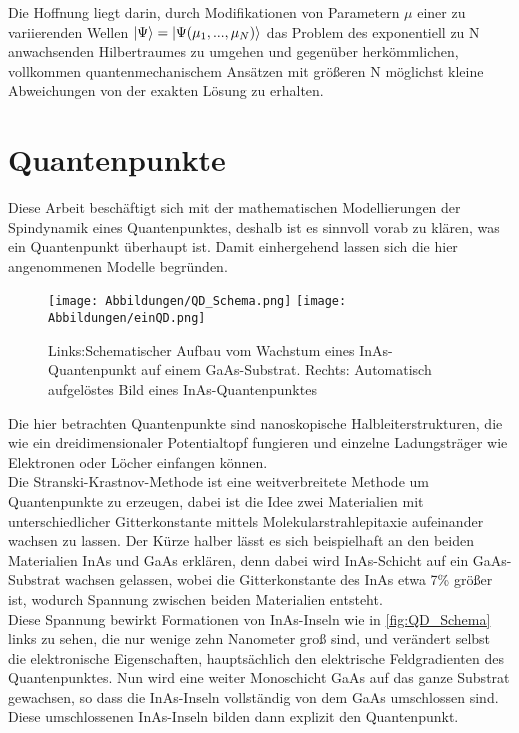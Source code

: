 \documentclass[12pt]{article}
\begin{document}
\noindent Die Hoffnung liegt darin, durch Modifikationen von Parametern $\mu$ einer zu variierenden Wellen 
$\ket{\Psi} = \ket{\Psi(\mu_1,...,\mu_N)}$ das Problem des exponentiell zu N anwachsenden Hilbertraumes zu umgehen und gegenüber 
herkömmlichen, vollkommen quantenmechanischem Ansätzen mit größeren N möglichst kleine Abweichungen von der exakten Lösung zu erhalten.

\newpage

















\section{Quantenpunkte}
\noindent Diese Arbeit beschäftigt sich mit der mathematischen Modellierungen der Spindynamik eines Quantenpunktes, deshalb ist es 
sinnvoll vorab zu klären, was ein Quantenpunkt überhaupt ist. Damit einhergehend lassen sich die hier angenommenen Modelle begründen.\\



\begin{figure}[h!]
    \centering
    \texttt{[image: Abbildungen/QD\_Schema.png]}
    \texttt{[image: Abbildungen/einQD.png]}
    \caption{Links:Schematischer Aufbau vom Wachstum eines InAs-Quantenpunkt auf einem GaAs-Substrat. Rechts: Automatisch 
    aufgelöstes Bild eines InAs-Quantenpunktes}
    \label{fig:QD_Schema}
\end{figure}

\noindent Die hier betrachten Quantenpunkte sind nanoskopische Halbleiterstrukturen, die wie ein dreidimensionaler Potentialtopf fungieren
 und einzelne Ladungsträger wie Elektronen oder Löcher einfangen können.\\
Die Stranski-Krastnov-Methode ist eine weitverbreitete Methode um Quantenpunkte zu erzeugen, dabei ist die Idee zwei Materialien mit 
unterschiedlicher Gitterkonstante mittels Molekularstrahlepitaxie aufeinander wachsen zu lassen. Der Kürze halber lässt es sich 
beispielhaft an den beiden Materialien InAs und GaAs erklären, denn dabei wird InAs-Schicht auf ein GaAs-Substrat wachsen gelassen, 
wobei die Gitterkonstante des InAs etwa 7\% größer ist, wodurch Spannung zwischen beiden Materialien entsteht. \\
\noindent Diese Spannung bewirkt Formationen von InAs-Inseln wie in \autoref{fig:QD_Schema} links zu sehen, die nur wenige zehn 
Nanometer groß sind, und verändert selbst die elektronische Eigenschaften, hauptsächlich den elektrische Feldgradienten des 
Quantenpunktes. Nun wird eine weiter Monoschicht GaAs auf das ganze Substrat gewachsen, so dass die InAs-Inseln vollständig von 
dem GaAs umschlossen sind. Diese umschlossenen InAs-Inseln bilden dann explizit den Quantenpunkt.\\
\end{document}
